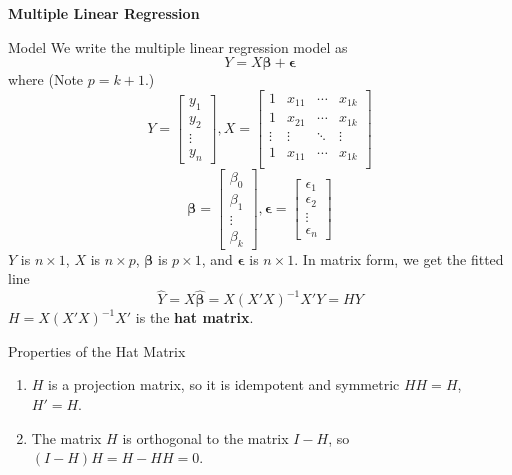 \documentclass{article}
\begin{document}
\begin{center}{\large{\textbf{Multiple Linear Regression}}}\\
\end{center}

\begin{multicols*}{3}
    \begin{blackbox}{Model}
        We write the multiple linear regression model as 
        \[Y = X\boldsymbol{\beta} + \boldsymbol{\epsilon}\]
        where (Note $p = k+1$.) 
        \renewcommand{\arraystretch}{1.25}
        \[Y = \begin{bmatrix}
            y_1\\y_2\\\vdots\\y_n
        \end{bmatrix}, X = \begin{bmatrix}
            1 & x_{11} & \cdots & x_{1k}\\
            1 & x_{21} & \cdots & x_{1k}\\
            \vdots & \vdots & \ddots & \vdots\\
            1 & x_{11} & \cdots & x_{1k}\\
        \end{bmatrix} \]
        \[\boldsymbol{\beta} = \begin{bmatrix}
            \beta_0 \\\beta_1\\\vdots\\ \beta_k
        \end{bmatrix}, \boldsymbol{\epsilon} = \begin{bmatrix}
            \epsilon_1 \\ \epsilon_2 \\ \vdots \\ \epsilon_n
        \end{bmatrix}\]
        $Y$ is $n \times 1$, $X$ is $n\times p$, $\boldsymbol{\beta}$ is $p\times 1$, and $\boldsymbol{\epsilon}$ is $n \times 1$. 
        In matrix form, we get the fitted line 
        \[\hat{Y} = X\boldsymbol{\hat{\beta}} = X(X'X)^{-1}X'Y = HY\]
        $H =  X(X'X)^{-1}X'$ is the \textbf{hat matrix}.
        \begin{bluebox}{Properties of the Hat Matrix}
            \begin{enumerate}[label=(\alph*)]
                \item $H$ is a projection matrix, so it is idempotent and symmetric $HH = H$, $H' = H$.
                \item The matrix $H$ is orthogonal to the matrix $I - H$, so $(I - H)H = H - HH = 0$.

\end{enumerate}
\end{bluebox}
\end{blackbox}
\end{multicols*}
\end{document}
